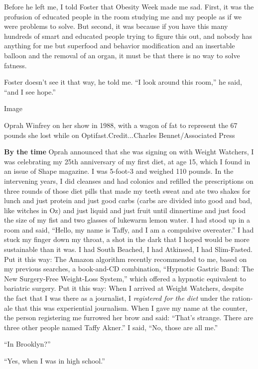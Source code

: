 Before he left me, I told Foster that Obesity Week made me sad. First,
it was the profusion of educated people in the room studying me and my
people as if we were problems to solve. But second, it was because if
you have this many hundreds of smart and educated people trying to
figure this out, and nobody has anything for me but superfood and
behavior modification and an insertable balloon and the removal of an
organ, it must be that there is no way to solve fatness.

Foster doesn't see it that way, he told me. ``I look around this room,''
he said, ``and I see hope.''

Image

Oprah Winfrey on her show in 1988, with a wagon of fat to represent the
67 pounds she lost while on Optifast.Credit...Charles Bennet/Associated
Press

\textbf{By the time} Oprah announced that she was signing on with Weight
Watchers, I was celebrating my 25th anniversary of my first diet, at age
15, which I found in an issue of Shape magazine. I was 5-foot-3 and
weighed 110 pounds. In the intervening years, I did cleanses and had
colonics and refilled the prescriptions on three rounds of those diet
pills that made my teeth sweat and ate two shakes for lunch and just
protein and just good carbs (carbs are divided into good and bad, like
witches in Oz) and just liquid and just fruit until dinnertime and just
food the size of my fist and two glasses of lukewarm lemon water. I had
stood up in a room and said, ``Hello, my name is Taffy, and I am a
compulsive overeater.'' I had stuck my finger down my throat, a shot in
the dark that I hoped would be more sustainable than it was. I had South
Beached, I had Atkinsed, I had Slim-Fasted. Put it this way: The Amazon
algorithm recently recommended to me, based on my previous searches, a
book-and-CD combination, ``Hypnotic Gastric Band: The New Surgery-Free
Weight-Loss System,'' which offered a hypnotic equivalent to bariatric
surgery. Put it this way: When I arrived at Weight Watchers, despite the
fact that I was there as a journalist, I \emph{registered for the diet}
under the ra­tion­ale that this was experiential journalism. When I gave
my name at the counter, the person registering me furrowed her brow and
said: ``That's strange. There are three other people named Taffy
Akner.'' I said, ``No, those are all me.''

``In Brooklyn?''

``Yes, when I was in high school.''

